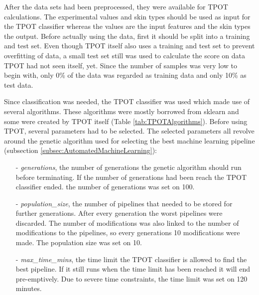 \documentclass[10pt,a4paper]{article}
\begin{document}
	After the data sets had been preprocessed, they were available for TPOT calculations. The experimental values and skin types should be used as input for the TPOT classifier whereas the values are the input features and the skin types the output. Before actually using the data, first it should be split into a training and test set. Even though TPOT itself also uses a training and test set to prevent overfitting of data, a small test set still was used to calculate the score on data TPOT had not seen itself, yet. Since the number of samples was very low to begin with, only 0\% of the data was regarded as training data and only 10\% as test data.
	
	 Since classification was needed, the TPOT classifier was used which made use of several algorithms. These algorithms were mostly borrowed from sklearn and some were created by TPOT itself (Table \ref{tab:TPOTAlgorithms}). Before using TPOT, several parameters had to be selected. The selected parameters all revolve around the genetic algorithm used for selecting the best machine learning pipeline (subsection \ref{subsec:AutomatedMachineLearning}):
	 
	 \begin{enumerate}
	 	\item[-] \textit{generations}, the number of generations the genetic algorithm should run before terminating. If the number of generations had been reach the TPOT classifier ended. the number of generations was set on 100.
	 	\item[-] \textit{population\_size}, the number of pipelines that needed to be stored for further generations. After every generation the worst pipelines were discarded. The number of modifications was also linked to the number of modifications to the pipelines, so every generations 10 modifications were made. The population size was set on 10.
	 	\item[-] \textit{max\_time\_mins}, the time limit the TPOT classifier is allowed to find the best pipeline. If it still runs when the time limit has been reached it will end pre-emptively. Due to severe time constraints, the time limit was set on 120 minutes. 
	 \end{enumerate}
	
\end{document}
